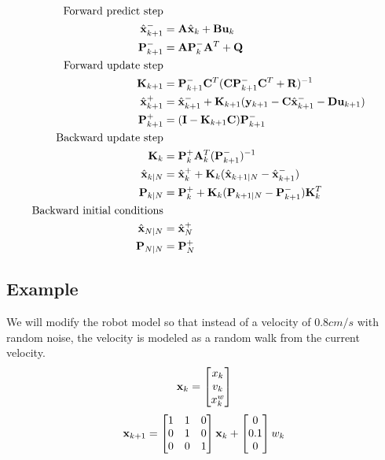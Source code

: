 \begin{theorem}
  \label{thm:kalman_smoother}
  \begin{align}
    \text{Forward predict step} \nonumber \\
    \hat{\mathbf{x}}_{k+1}^- &= \mathbf{A}\hat{\mathbf{x}}_k + \mathbf{B} \mathbf{u}_k \\
    \mathbf{P}_{k+1}^- &= \mathbf{A} \mathbf{P}_k^- \mathbf{A}^T + \mathbf{Q} \\
    \text{Forward update step} \nonumber \\
    \mathbf{K}_{k+1} &=
      \mathbf{P}_{k+1}^- \mathbf{C}^T (\mathbf{C}\mathbf{P}_{k+1}^- \mathbf{C}^T +
      \mathbf{R})^{-1} \\
    \hat{\mathbf{x}}_{k+1}^+ &=
      \hat{\mathbf{x}}_{k+1}^- + \mathbf{K}_{k+1}(\mathbf{y}_{k+1} -
      \mathbf{C} \hat{\mathbf{x}}_{k+1}^- - \mathbf{D}\mathbf{u}_{k+1}) \\
    \mathbf{P}_{k+1}^+ &= (\mathbf{I} - \mathbf{K}_{k+1}\mathbf{C})\mathbf{P}_{k+1}^- \\
    \text{Backward update step} \nonumber \\
    \mathbf{K}_k &= \mathbf{P}_k^+ \mathbf{A}_k^T (\mathbf{P}_{k+1}^-)^{-1} \\
    \hat{\mathbf{x}}_{k|N} &= \hat{\mathbf{x}}_k^+ +
      \mathbf{K}_k(\hat{\mathbf{x}}_{k+1|N} - \hat{\mathbf{x}}_{k+1}^-) \\
    \mathbf{P}_{k|N} &=
      \mathbf{P}_k^+ + \mathbf{K}_k(\mathbf{P}_{k+1|N} - \mathbf{P}_{k+1}^-)\mathbf{K}_k^T \\
    \text{Backward initial conditions} \nonumber \\
    \hat{\mathbf{x}}_{N|N} &= \hat{\mathbf{x}}_N^+ \\
    \mathbf{P}_{N|N} &= \mathbf{P}_N^+
  \end{align}
\end{theorem}

\subsection{Example}

We will modify the robot model so that instead of a velocity of $0.8 cm/s$ with
random noise, the velocity is modeled as a random walk from the current
velocity.
\begin{equation}
  \mathbf{x}_k =
  \begin{bmatrix}
    x_k \\
    v_k \\
    x_k^w
  \end{bmatrix}
\end{equation}
\begin{equation}
  \mathbf{x}_{k+1} =
  \begin{bmatrix}
    1 & 1 & 0 \\
    0 & 1 & 0 \\
    0 & 0 & 1
  \end{bmatrix} \mathbf{x}_k +
  \begin{bmatrix}
    0 \\
    0.1 \\
    0
  \end{bmatrix} w_k
\end{equation}

